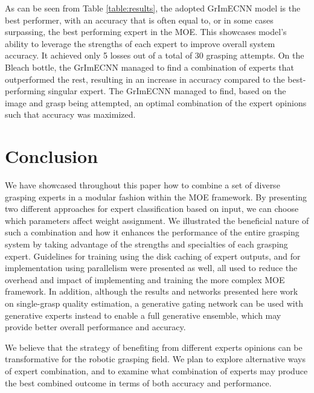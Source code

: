 \documentclass[letterpaper, 10 pt, conference]{ieeeconf}
\begin{document}
As can be seen from Table \ref{table:results}, the adopted GrImECNN model is the best performer, with an accuracy that is often equal to, or in some cases surpassing, the best performing expert in the MOE. This showcases model's ability to leverage the strengths of each expert to improve overall system accuracy. It achieved only 5 losses out of a total of 30 grasping attempts. On the Bleach bottle, the GrImECNN managed to find a combination of experts that outperformed the rest, resulting in an increase in accuracy compared to the best-performing singular expert.  The GrImECNN managed to find, based on the image and grasp being attempted, an optimal combination of the expert opinions such that accuracy was maximized.


\section{Conclusion}
\label{sec:conclusion}

We have showcased throughout this paper how to combine a set of diverse grasping experts in a modular fashion within the MOE framework. By presenting two different approaches for expert classification based on input, we can choose which parameters affect weight assignment. We illustrated the beneficial nature of such a combination and how it enhances the performance of the entire grasping system by taking advantage of the strengths and specialties of each grasping expert.  Guidelines for training using the disk caching of expert outputs, and for implementation using parallelism were presented as well, all used to reduce the overhead and impact of implementing and training the more complex MOE framework.  In addition, although the results and networks presented here work on single-grasp quality estimation, a generative gating network can be used with generative experts instead to enable a full generative ensemble, which may provide better overall performance and accuracy.

We believe that the strategy of benefiting from different experts opinions can be transformative for the robotic grasping field. We plan to explore alternative ways of expert combination, and to examine what combination of experts may produce the best combined outcome in terms of both accuracy and performance.



\end{document}
